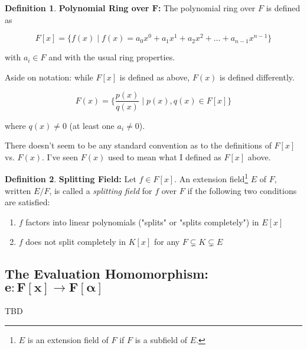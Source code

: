 \documentclass[11pt, oneside]{article}   	%
\theoremstyle{definition}
\newtheorem{definition}{Definition}[section]
\begin{document}
\begin{definition}
\textbf{Polynomial Ring over $\mathbf{F}$:} The polynomial ring
over $F$ is defined as

\begin{equation*}
F[x] = \{f(x) \mid f(x) = a_0x^0 + a_1x^1 +a_2x^2 + \hdots +
a_{n-1}x^{n-1} \} 
\end{equation*}

\bigskip
\noindent
with $a_i \in F$ and with the usual ring properties.

\bigskip
\noindent
Aside on notation: while $F[x]$ is defined as above, $F(x)$ is
defined differently.  

\begin{equation*}
F(x) = \Bigg  \{\frac{p(x)}{q(x)} \; \bigg \lvert  \; p(x),q(x)
\in F[x]  \Bigg \} 
\end{equation*}
\label{def:polynomials}
\end{definition}

\noindent
where $q(x) \neq 0$ (at least one $a_{i} \neq 0$).

\bigskip
\noindent
There doesn't seem to be any standard convention as to the
definitions of $F[x]$ vs. $F(x)$. I've seen $F(x)$ used to mean
what I defined as $F[x]$ above.

\begin{definition}
\textbf{Splitting Field:} Let $f \in F[x]$. An extension
field\footnote{$E$ is an extension field of $F$ if $F$ is a
subfield of $E$.}  $E$ of $F$, written $E/F$, is called a
\emph{splitting field} for $f$ over $F$ if the following two
conditions are satisfied:

\begin{enumerate}
\item $f$ factors into linear polynomials ("splits" or "splits
completely") in $E [x]$
\item $f$ does not split completely in $K[x]$ for any $F
\subsetneq K \subsetneq E$ 
\end{enumerate}
\label{def:splitting_field}
\end{definition}

\subsection{The Evaluation Homomorphism: $\boldsymbol{e: F[x]
\rightarrow F[\alpha]}$} 
TBD

\end{document}
